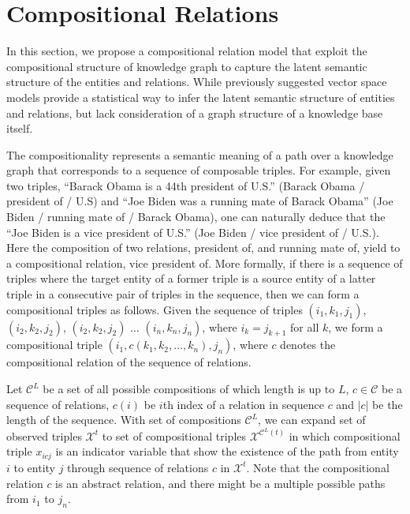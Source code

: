 \section{Compositional Relations}
\label{sec:comp}

In this section, we propose a compositional relation model that exploit the compositional structure of
knowledge graph to capture the latent semantic structure of the entities and relations.
While previously suggested vector space models provide a statistical way to infer the latent semantic
structure of entities and relations, but lack consideration of a graph structure of a knowledge base itself.

The compositionality represents a semantic meaning of a path over a knowledge graph that corresponds to a
sequence of composable triples.
For example, given two triples, ``Barack Obama is a 44th president of U.S.'' (Barack Obama / president of /
U.S) and ``Joe Biden was a running mate of Barack Obama'' (Joe Biden / running mate of / Barack Obama),
one can naturally deduce that the ``Joe Biden is a vice president of U.S.'' (Joe Biden / vice president of / U.S.).
Here the composition of two relations, president of, and running mate of, yield to a compositional relation,
vice president of.
More formally, if there is a sequence of triples where the target entity of a former triple is a source entity of a
latter triple in a consecutive pair of triples in the sequence, then we can form a compositional triples
as follows.
Given the sequence of triples
$(i_1, k_1 ,j_1)$,  $(i_2, k_2, j_2)$, $(i_2, k_2, j_2)$ $\dots$ $(i_n, k_n, j_n)$, where $i_k = j_{k+1}$ for all $k
$,  we form a compositional triple $(i_1, {c}(k_1, k_2, \dots, k_n), j_n)$, where $c$ denotes the compositional
relation of the sequence of relations.

Let $\mathcal{C}^{L}$ be a set of all possible compositions of which length is up to $L$, $c \in \mathcal{C}$
be a sequence of relations, $c(i)$ be $i$th index of a relation in sequence $c$ and $|c|$ be the length of the
sequence. With set of compositions $\mathcal{C}^{L}$, we can expand set of observed triples
$\mathcal{X}^{t}$ to set of compositional triples $\mathcal{X}^{\mathcal{C}^{L}(t)}$ in which
compositional triple $x_{icj}$ is an
indicator variable that show the existence of the path from entity $i$ to entity $j$ through sequence
of relations
$c$ in $\mathcal{X}^{t}$. Note that the compositional relation $c$ is an abstract relation, and there might be a
multiple possible paths from $i_1$ to $j_n$.

